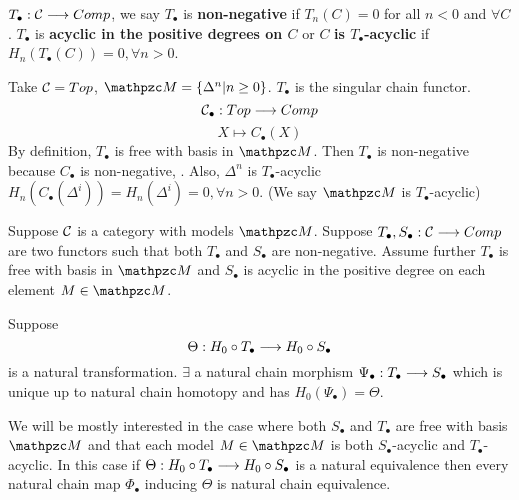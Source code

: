 \documentclass[11pt]{book} %
\begin{document}
\begin{proposition}
\begin{definition}
$T_\bullet:{\cal C}\longrightarrow Comp$, we say $T_\bullet$ is \textbf{non-negative} if $T_n(C)=0$ for all $n<0$ and $\forall C$. $T_\bullet$ is \textbf{acyclic in the positive degrees on $C$} or $C$ \textbf{is $T_\bullet$-acyclic } if $H_n(T_\bullet(C))=0,\forall n>0$. 
\end{definition}

\begin{example}
Take ${\cal C}=Top$, $\pzm=\{\Delta^n|n\geq 0\}$.  $T_\bullet$ is the singular chain functor.
$$
{\cal C}_\bullet: Top\longrightarrow Comp
$$
$$
X\mapsto C_\bullet(X)
$$
By definition, $T_\bullet$ is free with basis in $\pzm$.
Then $T_\bullet$ is non-negative because
$C_\bullet$ is non-negative, \checkmark. Also, $\Delta^n$ is $T_\bullet$-acyclic
$H_n(C_\bullet(\Delta^i))=H_n(\Delta^i)=0,\forall n>0$\checkmark. (We say $\pzm$ is $T_\bullet$-acyclic)
\end{example}
\begin{theorem}\label{apendix:thm:Acyclic_models_theorem}
Suppose ${\cal C}$ is a category with models $\pzm$. Suppose $T_\bullet, S_\bullet:{\cal C}\longrightarrow Comp$ are two functors such that both $T_\bullet$ and $S_\bullet$ are non-negative. Assume further $T_\bullet$ is free with basis in $\pzm$ and $S_\bullet$ is acyclic in the positive degree on each element $M\in\pzm$.

Suppose 
$$
\Theta: H_0\circ T_\bullet\longrightarrow H_0\circ S_\bullet
$$
 is a natural transformation. $\exists $ a  natural chain morphism $\Psi_\bullet:T_\bullet\longrightarrow S_\bullet$ which is unique up to natural chain homotopy and has $H_0(\Psi_\bullet)=\Theta$.
\end{theorem}
\begin{corollary}
We will be mostly interested in the case where both $S_\bullet$ and $T_\bullet$ are free with basis $\pzm$ and that each model $M\in\pzm$ is both $S_\bullet$-acyclic and $T_\bullet$-acyclic. In this case if $\Theta: H_0\circ T_\bullet\longrightarrow H_0\circ S_\bullet$ is a natural equivalence then every natural chain map $\Phi_\bullet$ inducing $\Theta$ is natural chain equivalence.
\end{corollary}


\end{proposition}
\end{document}
